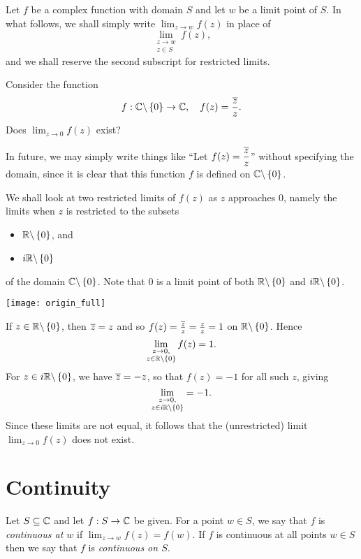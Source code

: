 Let $f$ be a complex function with domain $S$ and let $w$ be a limit point of $S$.  In what follows, we shall simply write $\displaystyle \lim_{z \to w} f(z)$ in place of \[
\lim_{\substack{z \to w \\ z \in S}} f(z),
\]
and we shall reserve the second subscript for restricted limits.



\begin{example}
\label{e:rlim}
Consider the function 
\[
f: \mathbb{C} \backslash \left\{0\right\} \to \mathbb{C}, \quad f(z) = \frac{\overline{z}}{z}.
\]
Does 
$
\displaystyle \lim_{z \to 0} f(z)
$
exist?
\end{example}
\begin{note}
In future, we may simply write things like ``Let $f(z) = \dfrac{\overline{z}}{z}$'' without specifying the domain, since it is clear that this function $f$ is defined on $\mathbb{C} \backslash \left\{0\right\}$.
\end{note}

We shall look at two restricted limits of $f(z)$ as $z$ approaches $0$, namely the limits when $z$ is restricted to the subsets
\begin{itemize}
\item $\mathbb{R} \backslash \left\{0\right\}$, and
\item $i \mathbb{R} \backslash \left\{0\right\}$ 
\end{itemize}
of the domain $\mathbb{C} \backslash \left\{0\right\}$.  Note that $0$ is a limit point of both $\mathbb{R} \backslash \left\{0\right\}$ and $i\mathbb{R} \backslash \left\{0\right\}$.
\begin{center}
\texttt{[image: origin\_full]}
\end{center}
If $z \in \mathbb{R} \backslash \left\{0\right\}$, then $\overline{z} = z$ and so $f(z) = \frac{\overline{z}}{z} = \frac{z}{z} =1$ on $\mathbb{R} \backslash \left\{0\right\}$.  Hence
\[
\lim_{\substack{z \to 0, \\ z \in \mathbb{R} \backslash \left\{0\right\} }} f(z)=1.
\]
For $z \in i \mathbb{R} \backslash \left\{0\right\}$, we have $\overline{z}=-z$, so that $f(z)=-1$ for all such $z$, giving
\[
\lim_{\substack{z \to 0, \\ z \in i\mathbb{R} \backslash \left\{0\right\} }}=-1.
\]
Since  these limits are not equal, it follows that the (unrestricted) limit $\lim_{z \to 0} f(z)$ does not exist.
\section{Continuity}

\begin{definition}
Let $S \subseteq \mathbb{C}$ and let $f:S \to \mathbb{C}$ be given.  For a point $w \in S$, we say that $f$ is \emph{continuous at $w$} if $\lim_{z \to w } f(z)=f(w)$. If $f$ is continuous at all points $w \in S$ then we say that $f$ is \emph{continuous on $S$}.
\end{definition}



